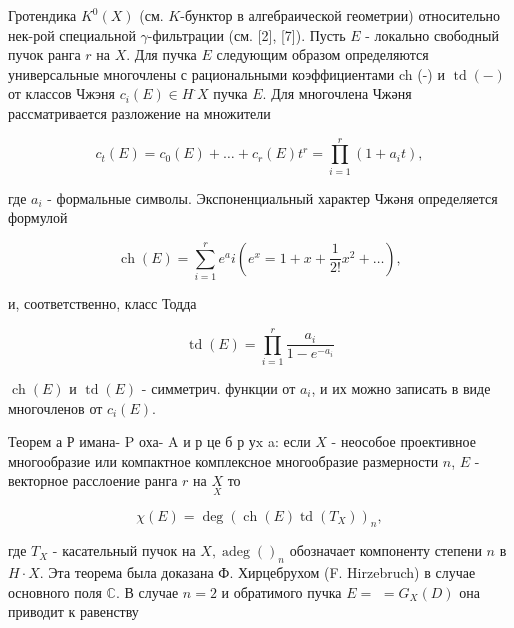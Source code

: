 \documentclass[10pt]{article}
\begin{document}
Гротендика $K^{0}(X)$ (см. $K$-бунктор в алгебраической геометрии) относительно нек-рой специальной $\gamma$-фильтрации (см. [2], [7]). Пусть $E$ - локально свободный пучок ранга $r$ на $X$. Для пучка $E$ следующим образом определяются универсальные многочлены с рациональными коэффициентами ch (-) и $\operatorname{td}(-)$ от классов Чжэня $c_{i}(E) \in H^{\cdot} X$ пучка $E$. Для многочлена Чжәня рассматривается разложение на множители



\[

c_{t}(E)=c_{0}(E)+\ldots+c_{r}(E) t^{r}=\prod_{i=1}^{r}\left(1+a_{i} t\right),

\]



где $a_{i}$ - формальные символы. Экспоненциальный характер Чжәня определяется формулой



\[

\operatorname{ch}(E)=\sum_{i=1}^{r} e^{a} i\left(e^{x}=1+x+\frac{1}{2 !} x^{2}+\ldots\right),

\]



и, соответственно, класс Тодда



\[

\operatorname{td}(E)=\prod_{i=1}^{r} \frac{a_{i}}{1-e^{-a_{i}}}

\]



$\operatorname{ch}(E)$ и $\operatorname{td}(E)$ - симметрич. функции от $a_{i}$, и их можно записать в виде многочленов от $c_{i}(E)$.



Теорем а Р имана- $\mathrm{P}$ оха- $\mathrm{A}$ и р це б р у$\mathrm{x}$ a: если $X$ - неособое проективное многообразие или компактное комплексное многообразие размерности $n$, $E$ - векторное расслоение ранга $r$ на $\underset{X}{X}$ то



\[

\chi(E)=\operatorname{deg}\left(\operatorname{ch}(E) \operatorname{td}\left(T_{X}\right)\right)_{n},

\]



где $T_{X}$ - касательный пучок на $X, \operatorname{adeg}()_{n}$ обозначает компоненту степени $n$ в $H \cdot X$. Эта теорема была доказана Ф. Хирцебрухом (F. Hirzebruch) в случае основного поля $\mathbb{C}$. В случае $n=2$ и обратимого пучка $E=$ $=G_{X}(D)$ она приводит к равенству
\end{document}
